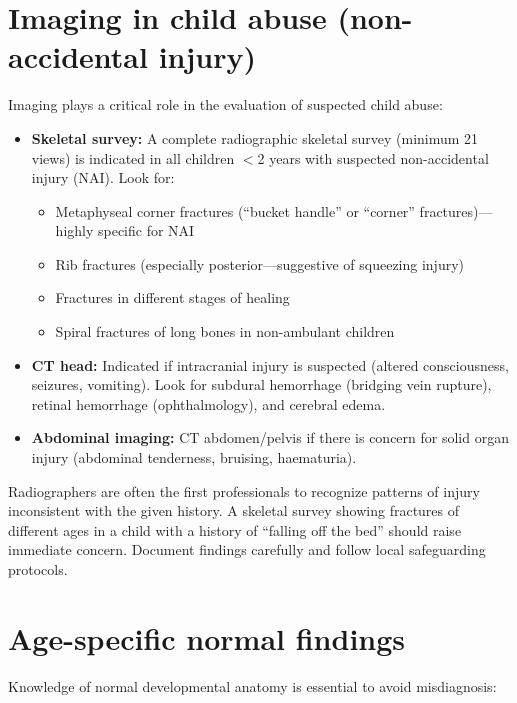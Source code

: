 \section{Imaging in child abuse (non-accidental injury)}
Imaging plays a critical role in the evaluation of suspected child abuse:
\begin{itemize}
    \item \textbf{Skeletal survey:} A complete radiographic skeletal survey (minimum 21 views) is indicated in all children $<$2 years with suspected non-accidental injury (NAI). Look for:
    \begin{itemize}
        \item Metaphyseal corner fractures (``bucket handle'' or ``corner'' fractures)---highly specific for NAI
        \item Rib fractures (especially posterior---suggestive of squeezing injury)
        \item Fractures in different stages of healing
        \item Spiral fractures of long bones in non-ambulant children
    \end{itemize}
    \item \textbf{CT head:} Indicated if intracranial injury is suspected (altered consciousness, seizures, vomiting). Look for subdural hemorrhage (bridging vein rupture), retinal hemorrhage (ophthalmology), and cerebral edema.
    \item \textbf{Abdominal imaging:} CT abdomen/pelvis if there is concern for solid organ injury (abdominal tenderness, bruising, haematuria).
\end{itemize}

\begin{pearlbox}
Radiographers are often the first professionals to recognize patterns of injury inconsistent with the given history. A skeletal survey showing fractures of different ages in a child with a history of ``falling off the bed'' should raise immediate concern. Document findings carefully and follow local safeguarding protocols.
\end{pearlbox}

\section{Age-specific normal findings}
Knowledge of normal developmental anatomy is essential to avoid misdiagnosis:

